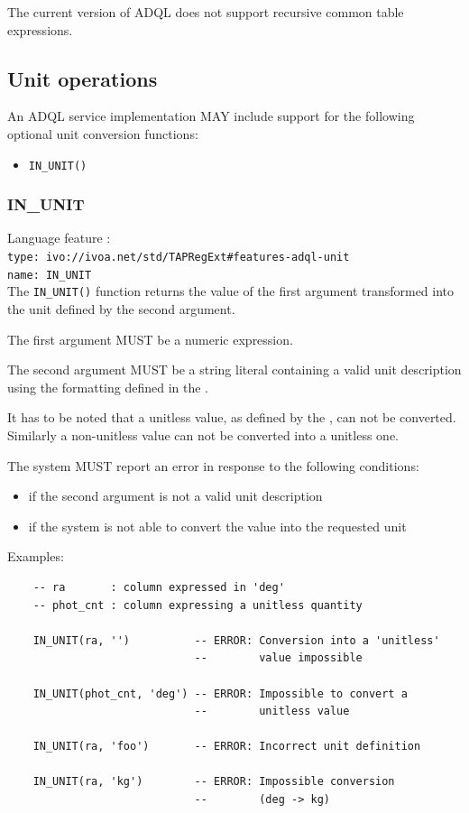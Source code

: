 \documentclass[11pt,a4paper]{ivoa}
\begin{document}
The current version of ADQL does not support recursive common table expressions.

\subsection{Unit operations}
\label{sec:unit}

An ADQL service implementation MAY include support for the following optional
unit conversion functions:

\begin{itemize}
    \item \verb:IN_UNIT():
\end{itemize}

\subsubsection{IN\_UNIT}
\label{sec:unit.in_unit}
{\footnotesize Language feature :}\\
{\footnotesize \verb|type: ivo://ivoa.net/std/TAPRegExt#features-adql-unit|}\\
{\footnotesize \verb|name: IN_UNIT|}\\

The \verb:IN_UNIT(): function returns the value of the first argument
transformed into the unit defined by the second argument.

The first argument MUST be a numeric expression.

The second argument MUST be a string literal containing a valid unit
description using the formatting defined in the \VOUnitSpec.

It has to be noted that a unitless value, as defined by the \VOUnitSpec, can not
be converted. Similarly a non-unitless value can not be converted into a
unitless one.

The system MUST report an error in response to the following conditions:
\begin{itemize}
    \item if the second argument is not a valid unit description
    \item if the system is not able to convert the value into the requested unit
\end{itemize}

Examples:

\begin{verbatim}
    -- ra       : column expressed in 'deg'
    -- phot_cnt : column expressing a unitless quantity

    IN_UNIT(ra, '')          -- ERROR: Conversion into a 'unitless'
                             --        value impossible

    IN_UNIT(phot_cnt, 'deg') -- ERROR: Impossible to convert a
                             --        unitless value

    IN_UNIT(ra, 'foo')       -- ERROR: Incorrect unit definition

    IN_UNIT(ra, 'kg')        -- ERROR: Impossible conversion
                             --        (deg -> kg)
\end{verbatim}
\end{document}
